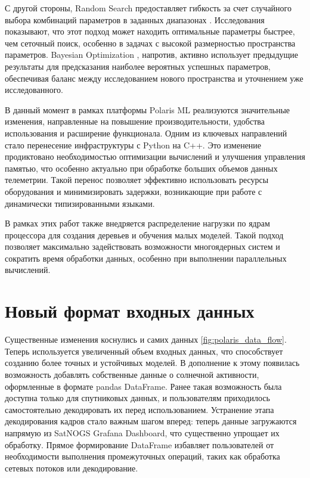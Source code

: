 \documentclass[14pt, a4paper]{bsu}
\begin{document}
С другой стороны, Random Search предоставляет гибкость за счет случайного
выбора комбинаций параметров в заданных диапазонах \cite{grid_search_tuning}.
Исследования показывают, что этот подход может находить оптимальные параметры
быстрее, чем сеточный поиск, особенно в задачах с высокой размерностью
пространства параметров. Bayesian Optimization \cite{grid_search_tuning},
напротив, активно использует предыдущие результаты для предсказания наиболее
вероятных успешных параметров, обеспечивая баланс между исследованием нового
пространства и уточнением уже исследованного.

В данный момент в рамках платформы Polaris ML реализуются значительные
изменения, направленные на повышение производительности, удобства использования
и расширение функционала. Одним из ключевых направлений стало перенесение
инфраструктуры с Python на C++. Это изменение продиктовано необходимостью
оптимизации вычислений и улучшения управления памятью, что особенно актуально
при обработке больших объемов данных телеметрии. Такой перенос позволяет
эффективно использовать ресурсы оборудования и минимизировать задержки,
возникающие при работе с динамически типизированными языками.

В рамках этих работ также внедряется распределение нагрузки по ядрам процессора
для создания деревьев и обучения малых моделей. Такой подход позволяет
максимально задействовать возможности многоядерных систем и сократить время
обработки данных, особенно при выполнении параллельных вычислений.

\section{Новый формат входных данных}

Существенные изменения коснулись и самих данных \ref{fig:polaris_data_flow}.
Теперь используется увеличенный объем входных данных, что способствует созданию
более точных и устойчивых моделей. В дополнение к этому появилась возможность
добавлять собственные данные о солнечной активности, оформленные в формате
pandas DataFrame. Ранее такая возможность была доступна только для спутниковых
данных, и пользователям приходилось самостоятельно декодировать их перед
использованием. Устранение этапа декодирования кадров стало важным шагом
вперед: теперь данные загружаются напрямую из SatNOGS Grafana Dashboard, что
существенно упрощает их обработку. Прямое формирование DataFrame избавляет
пользователей от необходимости выполнения промежуточных операций, таких как
обработка сетевых потоков или декодирование.
\end{document}
